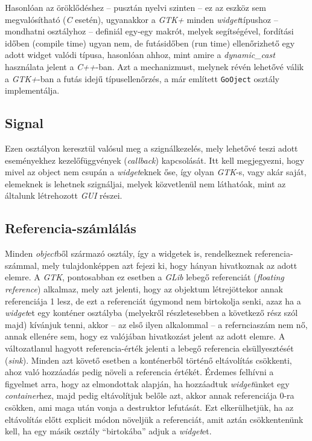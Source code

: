 Hasonlóan az öröklődéshez -- pusztán nyelvi szinten -- ez az eszköz sem megvalósítható (\textit{C} esetén), ugyanakkor a \textit{GTK+} minden \textit{widget}típushoz -- mondhatni osztályhoz -- definiál egy-egy makrót, melyek segítségével, fordítási időben (compile time) ugyan nem, de futásidőben (run time) ellenőrizhető egy adott widget valódi típusa, hasonlóan ahhoz, mint amire a \textit{dynamic\_cast} használata jelent a \textit{C++}-ban. Azt a mechanizmust, melynek révén lehetővé válik a \textit{GTK+}-ban a futás idejű típusellenőrzés, a már említett \texttt{GoOject} osztály implementálja.

\subsection{Signal}

Ezen osztályon keresztül valósul meg a szignálkezelés, mely lehetővé teszi adott eseményekhez kezelőfüggvények (\textit{callback}) kapcsolását. Itt kell megjegyezni, hogy mivel az object nem csupán a \textit{widget}eknek őse, így olyan \textit{GTK}-s, vagy akár saját, elemeknek is lehetnek szignáljai, melyek közvetlenül nem láthatóak, mint az általunk létrehozott \textit{GUI} részei.

\subsection{Referencia-számlálás}

Minden \textit{object}ből származó osztály, így a widgetek is, rendelkeznek referencia-számmal, mely tulajdonképpen azt fejezi ki, hogy hányan hivatkoznak az adott elemre. A \textit{GTK}, pontosabban ez esetben a \textit{GLib} lebegő referenciát (\textit{floating reference}) alkalmaz, mely azt jelenti, hogy az objektum létrejöttekor annak referenciája 1 lesz, de ezt a referenciát úgymond nem birtokolja senki, azaz ha a \textit{widget}et egy konténer osztályba (melyekről részletesebben a következő rész szól majd) kívánjuk tenni, akkor -- az első ilyen alkalommal -- a refernciaszám nem nő, annak ellenére sem, hogy ez valójában hivatkozást jelent az adott elemre. A változatlanul hagyott referencia-érték jelenti a lebegő referencia elsüllyesztését (\textit{sink}). Minden azt követő esetben a konténerből történő eltávolítás csökkenti, ahoz való hozzáadás pedig növeli a referencia értékét. Érdemes felhívni a figyelmet arra, hogy az elmondottak alapján, ha hozzáadtuk \textit{widget}ünket egy \textit{container}hez, majd pedig eltávolítjuk belőle azt, akkor annak referenciája 0-ra csökken, ami maga után vonja a destruktor lefutását. Ezt elkerülhetjük, ha az eltávolítás előtt explicit módon növeljük a referenciát, amit aztán csökkentenünk kell, ha egy másik osztály ``birtokába'' adjuk a \textit{widget}et.

